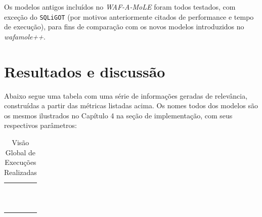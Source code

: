 Os modelos antigos incluídos no \textit{WAF-A-MoLE} foram todos testados, com exceção do \verb+SQLiGOT+ (por motivos anteriormente citados de performance e tempo de execução), para fins de comparação com os novos modelos introduzidos no \textit{wafamole++}.

\bigskip 

\section{Resultados e discussão}

Abaixo segue uma tabela com uma série de informações geradas de relevância, construídas a partir das métricas listadas acima. Os nomes todos dos modelos são os mesmos ilustrados no Capítulo 4 na seção de implementação, com seus respectivos parâmetros: 

\begin{table}[H]
\centering
\caption{Visão Global de Execuções Realizadas}
\begin{supertabular}{m{4.0cm}m{3.7cm}m{3.6cm}m{3.0cm}}
\hline
{} &
 &
 &
\centering{}\\\hline
{} &
 &
 &
\centering{}\\
 &
 &
 &
\centering{}\\
 &
 &
 &
\centering{}\\
 &
 &
 &
\centering{}\\
 &
 &
 &
\centering{}\\
 &
 &
 &
\centering{}\\
 &
 &
 &
\centering{}\\
 &
 &
 &
\centering{}\\
 &
 &
 &
\centering{}\\
 &
 &
 &
\centering{}\\
 &
 &
 &
\centering{}\\
\hline
\end{supertabular}
    \label{tab:tests}
\end{table}
\bigskip

